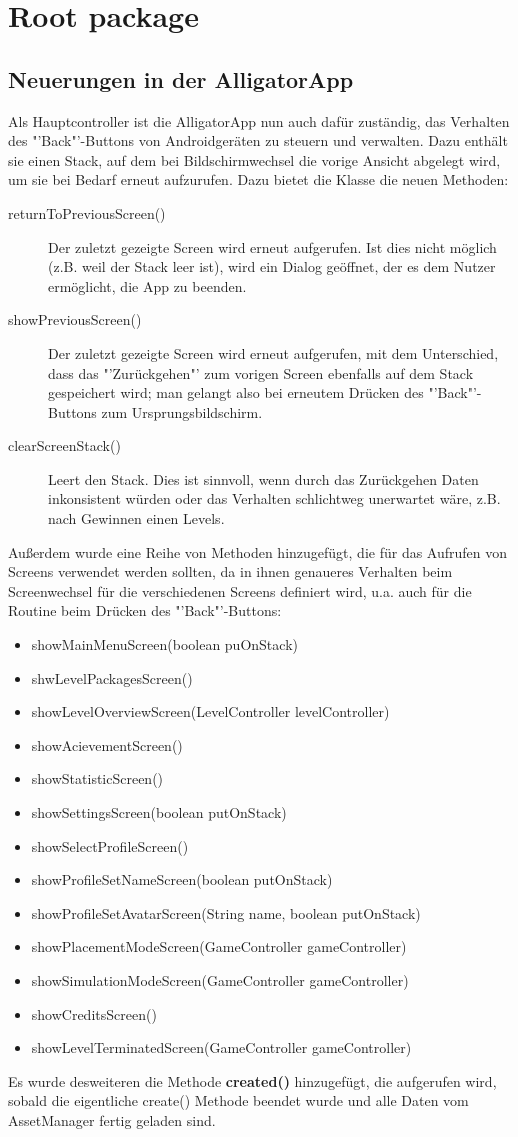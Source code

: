 \section{Root package}

\subsection{Neuerungen in der AlligatorApp}

Als Hauptcontroller ist die AlligatorApp nun auch dafür zuständig, das Verhalten des "'Back"'-Buttons von Androidgeräten zu steuern und verwalten. Dazu enthält sie einen Stack, auf dem bei Bildschirmwechsel die vorige Ansicht abgelegt wird, um sie bei Bedarf erneut aufzurufen. Dazu bietet die Klasse die neuen Methoden:
\begin{description}
	\item[returnToPreviousScreen()] Der zuletzt gezeigte Screen wird erneut aufgerufen. Ist dies nicht möglich (z.B. weil der Stack leer ist), wird ein Dialog geöffnet, der es dem Nutzer ermöglicht, die App zu beenden.
	\item[showPreviousScreen()] Der zuletzt gezeigte Screen wird erneut aufgerufen, mit dem Unterschied, dass das "'Zurückgehen"' zum vorigen Screen ebenfalls auf dem Stack gespeichert wird; man gelangt also bei erneutem Drücken des "'Back"'-Buttons zum Ursprungsbildschirm.
	\item[clearScreenStack()] Leert den Stack. Dies ist sinnvoll, wenn durch das Zurückgehen Daten inkonsistent würden oder das Verhalten schlichtweg unerwartet wäre, z.B. nach Gewinnen einen Levels.
\end{description}

Außerdem wurde eine Reihe von Methoden hinzugefügt, die für das Aufrufen von Screens verwendet werden sollten, da in ihnen genaueres Verhalten beim Screenwechsel für die verschiedenen Screens definiert wird, u.a. auch für die Routine beim Drücken des "'Back"'-Buttons:
\begin{itemize}
	\item showMainMenuScreen(boolean puOnStack)
	\item shwLevelPackagesScreen()
	\item showLevelOverviewScreen(LevelController levelController)
	\item showAcievementScreen()
	\item showStatisticScreen()
	\item showSettingsScreen(boolean putOnStack)
	\item showSelectProfileScreen()
	\item showProfileSetNameScreen(boolean putOnStack)
	\item showProfileSetAvatarScreen(String name, boolean putOnStack)
	\item showPlacementModeScreen(GameController gameController)
	\item showSimulationModeScreen(GameController gameController)
	\item showCreditsScreen()
	\item showLevelTerminatedScreen(GameController gameController)
\end{itemize}

Es wurde desweiteren die Methode \textbf{created()} hinzugefügt, die aufgerufen wird, sobald die eigentliche create() Methode beendet wurde und alle Daten vom AssetManager fertig geladen sind.
 

